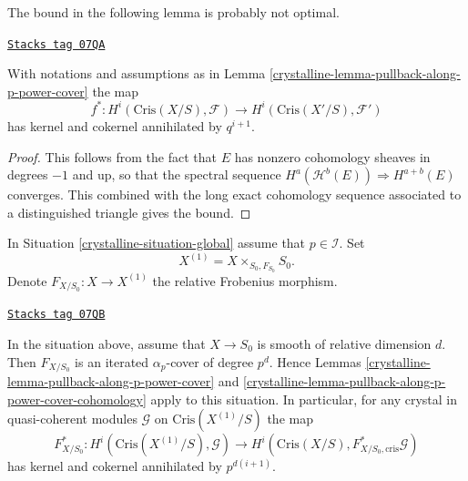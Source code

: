 The bound in the following lemma is probably not optimal.

\begin{lemma}
\label{crystalline-lemma-pullback-along-p-power-cover-cohomology}
\href{https://stacks.math.columbia.edu/tag/07QA}{\texttt{Stacks tag 07QA}}

With notations and assumptions as in
Lemma \ref{crystalline-lemma-pullback-along-p-power-cover}
the map
$$
f^* :
H^i(\text{Cris}(X/S), \mathcal{F})
\longrightarrow
H^i(\text{Cris}(X'/S), \mathcal{F}')
$$
has kernel and cokernel annihilated by $q^{i + 1}$.
\end{lemma}

\begin{proof}
This follows from the fact that $E$ has nonzero cohomology sheaves in
degrees $-1$ and up, so that the spectral sequence
$H^a(\mathcal{H}^b(E)) \Rightarrow H^{a + b}(E)$ converges.
This combined with the long exact cohomology sequence associated
to a distinguished triangle gives the bound.
\end{proof}

In Situation \ref{crystalline-situation-global} assume that $p \in \mathcal{I}$.
Set
$$
X^{(1)} = X \times_{S_0, F_{S_0}} S_0.
$$
Denote $F_{X/S_0} : X \to X^{(1)}$ the relative Frobenius morphism.

\begin{lemma}
\label{crystalline-lemma-pullback-relative-frobenius}
\href{https://stacks.math.columbia.edu/tag/07QB}{\texttt{Stacks tag 07QB}}

In the situation above, assume that $X \to S_0$ is smooth of relative
dimension $d$. Then $F_{X/S_0}$ is an iterated $\alpha_p$-cover
of degree $p^d$. Hence Lemmas \ref{crystalline-lemma-pullback-along-p-power-cover} and
\ref{crystalline-lemma-pullback-along-p-power-cover-cohomology} apply to this
situation. In particular, for any crystal in quasi-coherent modules
$\mathcal{G}$ on $\text{Cris}(X^{(1)}/S)$ the map
$$
F_{X/S_0}^* : H^i(\text{Cris}(X^{(1)}/S), \mathcal{G})
\longrightarrow
H^i(\text{Cris}(X/S), F_{X/S_0, \text{cris}}^*\mathcal{G})
$$
has kernel and cokernel annihilated by $p^{d(i + 1)}$.
\end{lemma}

